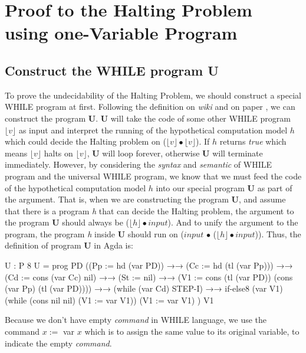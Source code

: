 \documentclass{jfrarticle}
\begin{document}
\section{Proof to the Halting Problem using one-Variable Program}
\subsection{Construct the WHILE program U}
To prove the undecidability of the Halting Problem, we should construct a special WHILE program at first.
Following the definition on \textit{wiki} \cite{halting_2015} and on paper \cite{boyer_mechanical_1984}, we can construct the program \textbf{U}.
\textbf{U} will take the code of some other WHILE program $\lfloor v\rfloor$ as input and interpret the running of the hypothetical computation model $h$ which could decide the Halting problem on ($\lfloor v\rfloor \bullet \lfloor v\rfloor$).
If $h$ returns \textit{true} which means $\lfloor v\rfloor$ halts on $\lfloor v\rfloor$, \textbf{U} will loop forever, otherwise \textbf{U} will terminate immediately.
However, by considering the \textit{syntax} and \textit{semantic} of WHILE program and the universal WHILE program, we know that we must feed the code of the hypothetical computation model $h$ into our special program \textbf{U} as part of the argument.
That is, when we are constructing the program \textbf{U}, and assume that there is a program \textit{h} that can decide the Halting problem, the argument to the program \textbf{U} should always be ($\lfloor h\rfloor \bullet input$).
And to unify the argument to the program, the program \textit{h} inside \textbf{U} should run on ($input$ $\bullet$ ($\lfloor h\rfloor \bullet input$)).
Thus, the definition of program \textbf{U} in Agda is:
\begin{code}[fontsize=\small]
U : P 8
U = prog PD ((Pp := hd (var PD))
            →→
            (Cc := hd (tl (var Pp)))
            →→
            (Cd := cons (var Cc) nil)
            →→
            (St := nil)
            →→
            (V1 := cons (tl (var PD)) (cons  (var Pp) (tl (var PD))))
            →→
            (while (var Cd) STEP-I)
            →→
            if-else8 (var V1) (while (cons nil nil) (V1 := var V1)) 
			      (V1 := var V1)
            )
          V1
\end{code}
Because we don't have empty \textit{command} in WHILE language, we use the command $x := $ var $x$ which is to assign the same value to its original variable, to indicate the empty \textit{command}.\\
\end{document}
